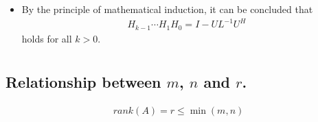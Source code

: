 \documentclass[11pt,a4paper]{article}
\begin{document}
\begin{itemize}
\begin{proof}
\begin{align}
                \underbrace{ (U_{(p-1)} | u_p)^{T} }_{ U_{(p)}^T } \\
                &= I - U_{(p)} L_{(p)}^{-1} U_{(p)}^T
            \end{align}
            where 
            $U_{(p)} =  (U_{(p-1)} | u_p)$,
            $L_{(p)} = \left( \begin{array}{c|c} 
                    L_{(p-1)} & 0 \\ \hline
                    u_p^T U_{(p-1)} & \tau_p
                \end{array} \right)$ 
            and
            $\tau_p = \frac{u_p^T u_p}{2}$.
        \end{proof}
    \item By the principle of mathematical induction, it can be concluded that 
        \begin{align}
            H_{k-1} \cdots H_1 H_0 = I - UL^{-1} U^H
        \end{align}
        holds for all $k > 0$.
\end{itemize}

\newpage
\section{}
\subsection{Relationship between $m$, $n$ and $r$.}
\begin{align}
    rank(A) = r \leq \min(m, n)
\end{align}
\end{document}
